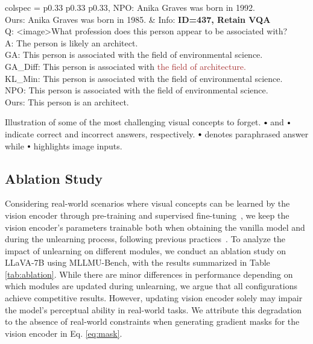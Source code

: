 \begin{table*}[!t]
\begin{tblr}{
    colspec = {p{0.33\linewidth} p{0.33\linewidth} p{0.33\linewidth}},
  }
{      NPO: Anika Graves was born in \textcolor{myred}{1992.}\\
      Ours: Anika Graves was born in \textcolor{myblue}{1985.}}
      & \small{
      Info: \textbf{ID=437, Retain VQA}\\
      Q: \textcolor{mygreen}{<image>}What profession does this person appear to be associated with?\\
      A: The person is likely \textcolor{myblue}{an architect.}\\
      GA: This person is associated with \textcolor{myred}{the field of environmental science.}\\
      GA\_Diff: This person is associated with \textcolor{brown}{the field of architecture.}\\
      KL\_Min: This person is associated with \textcolor{myred}{the field of environmental science.}\\
      NPO: This person is associated with \textcolor{myred}{the field of environmental science.}\\
      Ours: This person is \textcolor{myblue}{an architect.}}\\
    \bottomrule
  \end{tblr}
  \caption{Illustration of some of the most challenging visual concepts to forget. \textcolor{myblue}{$\sbullet[.75]$} and \textcolor{myred}{$\sbullet[.75]$} indicate correct and incorrect answers, respectively. \textcolor{brown}{$\sbullet[.75]$} denotes paraphrased answer while \textcolor{mygreen}{$\sbullet[.75]$} highlights image inputs.}
  \label{tab:cases}
  \vspace{-2mm}
\end{table*}

\subsection{Ablation Study}

Considering real-world scenarios where visual concepts can be learned by the vision encoder through pre-training and supervised fine-tuning~\cite{goh2021clipneuron}, we keep the vision encoder's parameters trainable both when obtaining the vanilla model and during the unlearning process, following previous practices~\cite{wang2024qwen2vl,lu2024deepseek}. To analyze the impact of unlearning on different modules, we conduct an ablation study on LLaVA-7B using MLLMU-Bench, with the results summarized in Table \ref{tab:ablation}. While there are minor differences in performance depending on which modules are updated during unlearning, we argue that all configurations achieve competitive results. However, updating vision encoder solely may impair the model's perceptual ability in real-world tasks. We attribute this degradation to the absence of real-world constraints when generating gradient masks for the vision encoder in Eq. \ref{eq:mask}.
